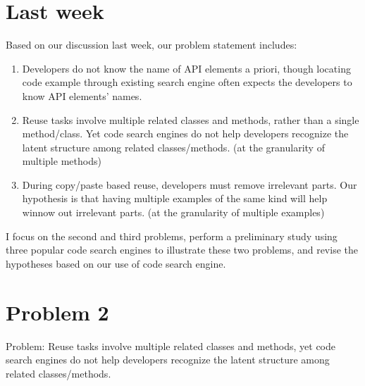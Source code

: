 
\section{Last week}

Based on our discussion last week, our problem statement includes:

\begin{enumerate}
\item Developers do not know the name of API elements a priori, though locating code example through existing search engine often expects the developers to know API elements' names.
\item Reuse tasks involve multiple related classes and methods, rather than a single method/class. Yet code search engines do not help developers recognize the latent structure among related classes/methods. (at the granularity of multiple methods)
\item During copy/paste based reuse, developers must remove irrelevant parts. Our hypothesis is that having multiple examples of the same kind will help winnow out irrelevant parts. (at the granularity of multiple examples)
\end{enumerate}

%
%
%

I focus on the second and third problems, perform a preliminary study using three popular code search engines to illustrate these two problems, and revise the hypotheses based on our use of code search engine. 

\section{Problem 2}
Problem: Reuse tasks involve multiple related classes and methods, yet code search engines do not help developers recognize the latent structure among related classes/methods.

